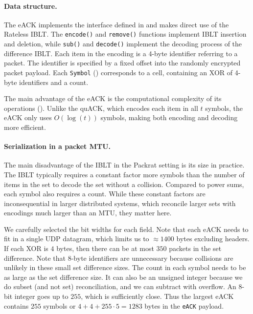 \paragraph{Data structure.}

The eACK implements
the interface defined in  and makes direct use of the Rateless IBLT.
The \texttt{encode()} and \texttt{remove()} functions implement IBLT insertion
and deletion, while \texttt{sub()} and \texttt{decode()} implement
the decoding process of the difference IBLT.
Each item in the encoding is a 4-byte identifier referring to a packet. The
identifier is specified by a fixed offset into the randomly encrypted packet
payload. Each \texttt{Symbol} () corresponds to a
cell, containing an XOR of 4-byte identifiers and a count.

The main advantage of the eACK is the computational complexity of its
operations (). Unlike the quACK,
which encodes each item in all $t$ symbols, the eACK only uses
$O(\log(t))$ symbols, making both encoding and decoding more efficient.



\paragraph{Serialization in a packet MTU.} The main disadvantage of the IBLT in
 the Packrat setting is its size in practice. The IBLT typically requires a constant factor
 more symbols than the number of items in the set to decode the set without a
 collision. Compared to power sums, each symbol also requires a count. While
 these constant factors are inconsequential in larger distributed systems,
 which reconcile larger sets with encodings much larger than an MTU, they
 matter here.

We carefully selected the bit widths for each field. Note that each eACK needs
to fit in a single UDP datagram, which limits us to $\approx\!1400$ bytes
excluding headers. If each XOR is $4$ bytes, then there can be at most $350$
packets in the set difference. Note that $8$-byte identifiers are unnecessary
because collisions are unlikely in these small set difference sizes. The count
in each symbol needs to be as large as the set difference size. It can also be
an unsigned integer because we do subset (and not set) reconciliation, and we
can subtract with overflow. An 8-bit integer goes up to $255$, which is
sufficiently close. Thus the largest eACK contains $255$ symbols or $4 +
4 + 255 \cdot 5 = 1283$ bytes in the \texttt{eACK} payload.

